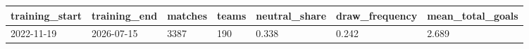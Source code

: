 \begin{tabular}{lllllll}
\toprule
training\_start & training\_end & matches & teams & neutral\_share & draw\_frequency & mean\_total\_goals \\
\midrule
2022-11-19 & 2026-07-15 & 3387 & 190 & 0.338 & 0.242 & 2.689 \\
\bottomrule
\end{tabular}
